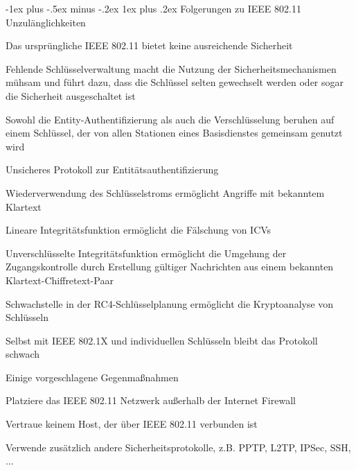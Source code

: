 \documentclass[a4paper]{article}
\makeatletter
\renewcommand{\subsubsection}{\@startsection{subsubsection}{3}{0mm}%
 {-1ex plus -.5ex minus -.2ex}%
 {1ex plus .2ex}%
 {\normalfont\small\bfseries}}
\makeatother
\begin{document}
\begin{multicols}{3}
      \subsubsection{Folgerungen zu IEEE 802.11 Unzulänglichkeiten}
      \begin{itemize*}
            \item Das ursprüngliche IEEE 802.11 bietet keine ausreichende Sicherheit
            \item Fehlende Schlüsselverwaltung macht die Nutzung der Sicherheitsmechanismen mühsam und führt dazu, dass die Schlüssel selten gewechselt werden oder sogar die Sicherheit ausgeschaltet ist
            \item Sowohl die Entity-Authentifizierung als auch die Verschlüsselung beruhen auf einem Schlüssel, der von allen Stationen eines Basisdienstes gemeinsam genutzt wird
            \item Unsicheres Protokoll zur Entitätsauthentifizierung
            \item Wiederverwendung des Schlüsselstroms ermöglicht Angriffe mit bekanntem Klartext
            \item Lineare Integritätsfunktion ermöglicht die Fälschung von ICVs
            \item Unverschlüsselte Integritätsfunktion ermöglicht die Umgehung der Zugangskontrolle durch Erstellung gültiger Nachrichten aus einem bekannten Klartext-Chiffretext-Paar
            \item Schwachstelle in der RC4-Schlüsselplanung ermöglicht die Kryptoanalyse von Schlüsseln
            \item Selbst mit IEEE 802.1X und individuellen Schlüsseln bleibt das Protokoll schwach
            \item Einige vorgeschlagene Gegenmaßnahmen
            \begin{itemize*}
                  \item Platziere das IEEE 802.11 Netzwerk außerhalb der Internet Firewall
                  \item Vertraue keinem Host, der über IEEE 802.11 verbunden ist
                  \item Verwende zusätzlich andere Sicherheitsprotokolle, z.B. PPTP, L2TP, IPSec, SSH, ...
            \end{itemize*}
      \end{itemize*}


\end{multicols}
\end{document}
